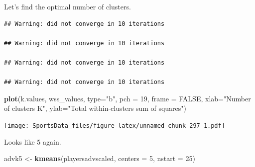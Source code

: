 \documentclass[]{book}
\newenvironment{Shaded}{\begin{snugshade}}{\end{snugshade}}
\newcommand{\CommentTok}[1]{\textcolor[rgb]{0.56,0.35,0.01}{\textit{#1}}}
\newcommand{\ControlFlowTok}[1]{\textcolor[rgb]{0.13,0.29,0.53}{\textbf{#1}}}
\newcommand{\DataTypeTok}[1]{\textcolor[rgb]{0.13,0.29,0.53}{#1}}
\newcommand{\DecValTok}[1]{\textcolor[rgb]{0.00,0.00,0.81}{#1}}
\newcommand{\KeywordTok}[1]{\textcolor[rgb]{0.13,0.29,0.53}{\textbf{#1}}}
\newcommand{\NormalTok}[1]{#1}
\newcommand{\OperatorTok}[1]{\textcolor[rgb]{0.81,0.36,0.00}{\textbf{#1}}}
\newcommand{\OtherTok}[1]{\textcolor[rgb]{0.56,0.35,0.01}{#1}}
\newcommand{\StringTok}[1]{\textcolor[rgb]{0.31,0.60,0.02}{#1}}
\begin{document}
Let's find the optimal number of clusters.

\begin{Shaded}
\end{Shaded}

\begin{verbatim}
## Warning: did not converge in 10 iterations

## Warning: did not converge in 10 iterations

## Warning: did not converge in 10 iterations

## Warning: did not converge in 10 iterations
\end{verbatim}

\begin{Shaded}
\begin{Highlighting}[]
\KeywordTok{plot}\NormalTok{(k.values, wss_values,}
       \DataTypeTok{type=}\StringTok{"b"}\NormalTok{, }\DataTypeTok{pch =} \DecValTok{19}\NormalTok{, }\DataTypeTok{frame =} \OtherTok{FALSE}\NormalTok{, }
       \DataTypeTok{xlab=}\StringTok{"Number of clusters K"}\NormalTok{,}
       \DataTypeTok{ylab=}\StringTok{"Total within-clusters sum of squares"}\NormalTok{)}
\end{Highlighting}
\end{Shaded}

\texttt{[image: SportsData\_files/figure-latex/unnamed-chunk-297-1.pdf]}

Looks like 5 again.

\begin{Shaded}
\begin{Highlighting}[]
\NormalTok{advk5 <-}\StringTok{ }\KeywordTok{kmeans}\NormalTok{(playersadvscaled, }\DataTypeTok{centers =} \DecValTok{5}\NormalTok{, }\DataTypeTok{nstart =} \DecValTok{25}\NormalTok{)}
\end{Highlighting}
\end{Shaded}
\end{document}
